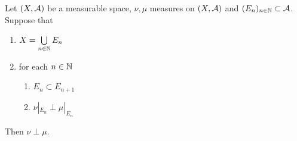 \documentclass{book}
\begin{document}
	\begin{ex} 
		Let $(X, \mathcal{A})$ be a measurable space, $\nu, \mu$ measures on $(X, \mathcal{A})$ and $(E_n)_{n \in \mathbb{N}} \subset \mathcal{A}$. Suppose that 
		\begin{enumerate}
			\item $X = \bigcup\limits_{n \in \mathbb{N}} E_n$
			\item for each $n \in \mathbb{N}$
			\begin{enumerate}
				\item $E_n \subset E_{n+1}$
				\item $\nu|_{E_n} \perp \mu|_{E_n}$
			\end{enumerate}
		\end{enumerate}
		Then $\nu \perp \mu$.
	\end{ex}
\end{document}
